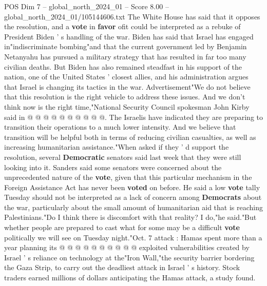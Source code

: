 \begin{textsample}{POS Dim 7 – global\_north\_2024\_01 – Score 8.00 – global\_north\_2024\_01/105144606.txt}
The White House has said that it opposes the resolution, and a \textbf{vote} in \textbf{favor} ofit could be interpreted as a rebuke of President Biden ' s handling of the war.
Biden has said that Israel has engaged in"indiscriminate bombing"and that the current government led by Benjamin Netanyahu has pursued a military strategy that has resulted in far too many civilian deaths.
But Biden has also remained steadfast in his support of the nation, one of the United States ' closest allies, and his administration argues that Israel is changing its tactics in the war.
Advertisement"We do not believe that this resolution is the right vehicle to address these issues.
And we don't think now is the right time,"National Security Council spokesman John Kirby said in @ @ @ @ @ @ @ @ @ @.
The Israelis have indicated they are preparing to transition their operations to a much lower intensity.
And we believe that transition will be helpful both in terms of reducing civilian casualties, as well as increasing humanitarian assistance."When asked if they ' d support the resolution, several \textbf{Democratic} senators said last week that they were still looking into it.
Sanders said some senators were concerned about the unprecedented nature of the \textbf{vote}, given that this particular mechanism in the Foreign Assistance Act has never been \textbf{voted} on before.
He said a low \textbf{vote} tally Tuesday should not be interpreted as a lack of concern among \textbf{Democrats} about the war, particularly about the small amount of humanitarian aid that is reaching Palestinians."Do I think there is discomfort with that reality?
I do,"he said."But whether people are prepared to cast what for some may be a difficult \textbf{vote} politically we will see on Tuesday night."Oct. 7 attack : Hamas spent more than a year planning its @ @ @ @ @ @ @ @ @ @ exploited vulnerabilities created by Israel ' s reliance on technology at the"Iron Wall,"the security barrier bordering the Gaza Strip, to carry out the deadliest attack in Israel ' s history.
Stock traders earned millions of dollars anticipating the Hamas attack, a study found.

\end{textsample}

